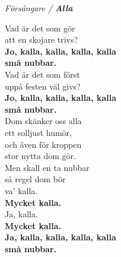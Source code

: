 \documentclass[a6paper,10pt]{article}
\begin{document}
\newpage
\setlength{\oddsidemargin}{-0.47in}
\noindent
\begin{center}
\textit{Försångare / \textbf{Alla}}
\end{center}
\begin{lyrics}
Vad är det som gör \\
att en skojare trivs? \\
\textbf{Jo, kalla, kalla, kalla, kalla \\
små nubbar. \\}
Vad är det som först \\
uppå festen väl givs? \\
\textbf{Jo, kalla, kalla, kalla, kalla \\
små nubbar. \\}
Dom skänker oss alla \\
ett solljust humör, \\
och även för kroppen \\
stor nytta dom gör. \\
Men skall en ta nubbar \\
så regel dom bör \\
va' kalla. \\
\textbf{Mycket kalla.\\}
Ja, kalla. \\
\textbf{Mycket kalla.\\
Ja, kalla, kalla, kalla, kalla \\
små nubbar. }
\end{lyrics}
\end{document}
